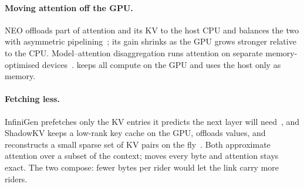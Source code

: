 
\paragraph{Moving attention off the GPU.} NEO offloads part of attention and
its KV to the host CPU and balances the two with asymmetric
pipelining~\cite{neo}; its gain shrinks as the GPU grows stronger relative to
the CPU. Model--attention disaggregation runs attention on separate
memory-optimised devices~\cite{lamina}. \sysname{} keeps all compute on the
GPU and uses the host only as memory.

\paragraph{Fetching less.} InfiniGen prefetches only the KV entries it
predicts the next layer will need~\cite{infinigen}, and ShadowKV keeps a
low-rank key cache on the GPU, offloads values, and reconstructs a small
sparse set of KV pairs on the fly~\cite{shadowkv}. Both approximate attention
over a subset of the context; \sysname{} moves every byte and attention stays
exact. The two compose: fewer bytes per rider would let the link carry more
riders.


